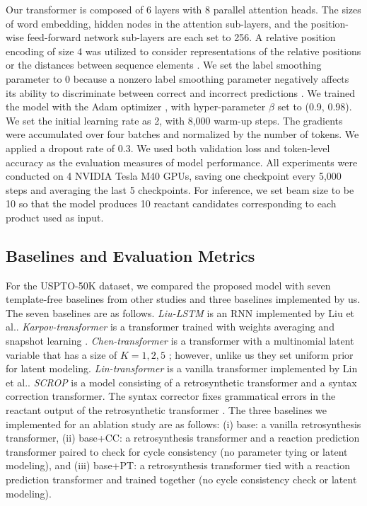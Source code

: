 \documentclass[journal=jacsat,manuscript=article]{achemso}
\begin{document}
	Our transformer is composed of 6 layers with 8 parallel attention heads. The sizes of word embedding, hidden nodes in the attention sub-layers, and the position-wise feed-forward network sub-layers are each set to 256. A relative position encoding of size 4 was utilized to consider representations of the relative positions or the distances between sequence elements \cite{shaw2018self}. We set the label smoothing parameter to 0 because a nonzero label smoothing parameter negatively affects its ability to discriminate between correct and incorrect predictions \cite{schwaller2019molecular}. We trained the model with the Adam optimizer \cite{kingma2014adam}, with hyper-parameter $\beta$ set to (0.9, 0.98). We set the initial learning rate as 2, with 8,000 warm-up steps. The gradients were accumulated over four batches and normalized by the number of tokens. We applied a dropout rate of 0.3. We used both validation loss and token-level accuracy as the evaluation measures of model performance. All experiments were conducted on 4 NVIDIA Tesla M40 GPUs, saving one checkpoint every 5,000 steps and averaging the last 5 checkpoints. For inference, we set beam size to be 10 so that the model produces 10 reactant candidates corresponding to each product used as input.
	
	
	\subsection{Baselines and Evaluation Metrics}
	
	For the USPTO-50K dataset, we compared the proposed model with seven template-free baselines from other studies \cite{liu2017retrosynthetic,karpov2019transformer,chen2019learning,lin2020automatic,zheng2019predicting} and three baselines implemented by us. The seven baselines are as follows. \textit{Liu-LSTM} is an RNN implemented by Liu et al.\cite{liu2017retrosynthetic}. \textit{Karpov-transformer} is a transformer trained with weights averaging and snapshot learning \cite{karpov2019transformer}. \textit{Chen-transformer} is a transformer with a multinomial latent variable that has a size of $K=1, 2, 5$ \cite{chen2019learning}; however, unlike us they set uniform prior for latent modeling. \textit{Lin-transformer} is a vanilla transformer implemented by Lin et al.\cite{lin2020automatic}. \textit{SCROP} is a model consisting of a retrosynthetic transformer and a syntax correction transformer. The syntax corrector fixes grammatical errors in the reactant output of the retrosynthetic transformer \cite{zheng2019predicting}. The three baselines we implemented for an ablation study are as follows: (i) base: a vanilla retrosynthesis transformer, (ii) base+CC: a retrosynthesis transformer and a reaction prediction transformer paired to check for cycle consistency (no parameter tying or latent modeling), and (iii) base+PT: a retrosynthesis transformer tied with a reaction prediction transformer and trained together (no cycle consistency check or latent modeling).
	
\end{document}

